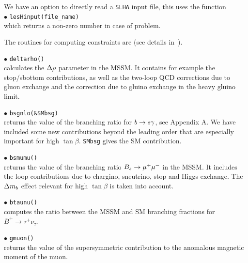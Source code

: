 \documentclass[12pt,a4paper]{article}
\begin{document}

We  have an option to directly read a {\tt SLHA}  input file, this uses the  function \\
\noi$\bullet$ \verb|lesHinput(file_name) |\\
which returns a non-zero number in case of problem.

The routines for computing constraints are (see details
in~\cite{Belanger:2004yn}).

\noi$\bullet$ \verb|deltarho()|\\
 calculates  the $\Delta\rho$ parameter in the MSSM.  It contains for example the 
stop/sbottom contributions, as well as the two-loop QCD
corrections due to gluon exchange and the correction due to gluino
exchange in the heavy gluino limit.

\noi$\bullet$ \verb|bsgnlo(&SMbsg)|\\ returns the value of the branching ratio for  $b\rightarrow s\gamma$, see Appendix A. 
We have included some new contributions beyond the leading order that are
especially important for high $\tan\beta$. \verb|SMbsg| gives the SM contribution.

\noi$\bullet$ \verb|bsmumu()|\\ returns the value of the branching ratio $B_s\to \mu^+\mu^-$ in the
MSSM.
It includes the loop contributions
due to chargino, sneutrino, stop and Higgs exchange. The $\Delta m_b$ 
effect relevant for high $\tan \beta$ is taken into account.

\noi$\bullet$ \verb|btaunu()|\\
computes the ratio between the MSSM and SM branching fractions for $\bar{B}^+\rightarrow\tau^+\nu_\tau$. 


\noi$\bullet$ \verb|gmuon()|\\
returns the value of the supersymmetric contribution to the
anomalous magnetic moment of the muon.
\end{document}
